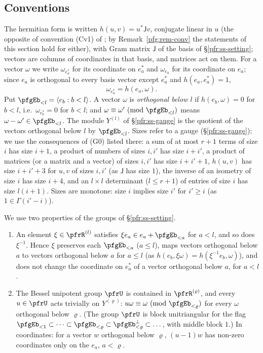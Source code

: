 \documentclass[10pt]{amsart}
\theoremstyle{definition}
\theoremstyle{remark}
\begin{document}
\subsection{Conventions}\label{pfg:ss-conv}
The hermitian form is written $h(u,v)=u^*\mathsf Jv$, conjugate linear in $u$ (the opposite of
convention (Cv1) of {\cite[\S2.1]{P51}}; by Remark~\ref{pfg:rem-conv} the statements of this section
hold for either), with Gram matrix $\mathsf J$ of the
basis of \S\ref{pfr:ss-setting}; vectors are columns of coordinates in that basis, and matrices act on them.
For a vector $\omega$ we write $\omega_{e^*_a}$ for its coordinate on $e^*_a$ and $\omega_{e_a}$ for its
coordinate on $e_a$; since $e_a$ is orthogonal to every basis vector except $e^*_a$ and $h(e_a,e^*_a)=1$,
\[
\omega_{e^*_a}=h(e_a,\omega).
\]
Put $\pfgEb_{<l}=\langle e_b:b<l\rangle$. A vector $\omega$ is \emph{orthogonal below $l$} if $h(e_b,\omega)=0$
for $b<l$, i.e.\ $\omega_{e_b^*}=0$ for $b<l$; and $\omega\equiv\omega'\ (\mathrm{mod}\ \pfgEb_{<l})$ means
$\omega-\omega'\in\pfgEb_{<l}$. The module $Y^{(l)}$ of \S\ref{pfr:ss-gauge} is the quotient of the vectors
orthogonal below $l$ by $\pfgEb_{<l}$. Sizes refer to a gauge (\S\ref{pfr:ss-gauge}); we use the
consequences of (G0) listed there: a sum of at most $r+1$ terms of size $i$ has size $i+1$, a product of
numbers of sizes $i,i'$ has size $i+i'$, a product of matrices (or a matrix and a vector) of sizes $i,i'$ has
size $i+i'+1$, $h(u,v)$ has size $i+i'+3$ for $u,v$ of sizes $i,i'$ (as $\mathsf J$ has size $1$), the
inverse of an isometry of size $i$ has size $i+4$, and an $l\times l$ determinant ($l\le r+1$) of entries of
size $i$ has size $l(i+1)$. Sizes are monotone: size $i$ implies size $i'$ for $i'\ge i$ (as $1\in\Gamma(i'-i)$).

We use two properties of the groups of \S\ref{pfr:ss-setting}.
\begin{enumerate}
\item[(R)] An element $\xi\in\pfrR^{(l)}$ satisfies $\xi e_a\in e_a+\pfgEb_{<a}$ for $a<l$, and so does
$\xi^{-1}$. Hence $\xi$ preserves each $\pfgEb_{<a}$ ($a\le l$), maps vectors orthogonal below $a$ to
vectors orthogonal below $a$ for $a\le l$ (as $h(e_b,\xi\omega)=h(\xi^{-1}e_b,\omega)$), and does not
change the coordinate on $e^*_a$ of a vector orthogonal below $a$, for $a<l$.
\item[(U)] The Bessel unipotent group $\pfrU$ is contained in $\pfrR^{(\varrho)}$, and every $u\in\pfrU$ acts
trivially on $Y^{(\varrho)}$: $u\omega\equiv\omega\ (\mathrm{mod}\ \pfgEb_{<\varrho})$ for every $\omega$
orthogonal below $\varrho$. (The group $\pfrU$ is block unitriangular for the flag $\pfgEb_{<1}\subset\dots
\subset\pfgEb_{<\varrho}\subset\pfgEb_{<\varrho}^\perp\subset\dots$, with middle block $1$.) In coordinates:
for a vector $w$ orthogonal below $\varrho$, $(u-1)w$ has non-zero coordinates only on the $e_a$, $a<\varrho$.
\end{enumerate}
\end{document}
